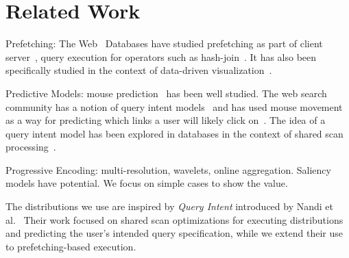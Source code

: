 \section{Related Work}

Prefetching: The Web~\cite{domenech2006web,nanopoulos2003data}
Databases have studied prefetching as part of client server~\cite{ramachandran2005dynamic,ramachandraholistic,sapia2000promise,smith1978sequentiality}, 
query execution for operators such as hash-join~\cite{chen2007improving}.
It has also been specifically studied in the context of data-driven visualization~\cite{jayachandran2014combining,battle2013scalar,battle2016dynamic,cetintemel2013query,debrabant2015seer}.

Predictive Models: mouse prediction~\cite{pasqual2014mouse,lane2005process,wobbrock2009angle,wobbrock2007gestures} has been well studied.
The web search community has a notion of query intent models~\cite{li2008learning} and has used mouse movement as a way for predicting which links a user will likely click on~\cite{guo2008exploring}.
The idea of a query intent model has been explored in databases in the context of shared scan processing~\cite{ebenstein2016fluxquery}.

Progressive Encoding: multi-resolution, wavelets, online aggregation.
Saliency models have potential.  We focus on simple cases to show the value.

The distributions we use are inspired by {\it Query Intent} introduced by Nandi et al.~\cite{ebenstein2016fluxquery,gesturequery} Their work focused on shared scan optimizations for executing distributions and predicting the user's intended query specification, while we extend their use to prefetching-based execution.

